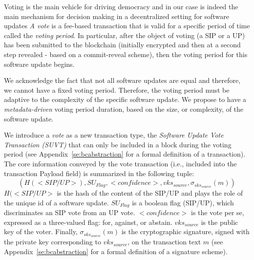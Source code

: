 Voting is the main vehicle for driving democracy and in our case is indeed the
main mechanism for decision making in a decentralized setting for software
updates
\emph{A vote} is a fee-based transaction that is valid for a specific period of
time called the \emph{voting period}. In particular, after the object of voting
(a SIP or a UP) has been submitted to the blockchain (initially encrypted and
then at a second step revealed - based on a commit-reveal
scheme),%
then the voting period for this software update begins.

We acknowledge the fact that not all software updates are equal and therefore,
we cannot have a fixed voting period.
Therefore, the voting period must be adaptive to the complexity of the specific
software update. We propose to have a \emph{metadata-driven} voting period
duration, based on the size, or complexity, of the software
update.%

We introduce a \emph{vote} as a new transaction type, the \emph{Software Update
  Vote Transaction (SUVT)} that can only be included in a block during the
voting period (see Appendix~\ref{se:bcabstraction} for a formal definition of a
transaction). The core information conveyed by the vote transaction (i.e.,
included into the transaction Payload field) is summarized in the following
tuple:
$$( H(<SIP/UP>),SU_{Flag},<confidence>,vks_{source},\sigma_{sks_{source}}(m))$$
$H(<SIP/UP>$ is the hash of the content of the SIP/UP and plays the role of the
unique id of a software update. $SU_{Flag}$ is a boolean flag (SIP/UP), which
discriminates an SIP vote from an UP vote. $<confidence>$ is the vote per se,
expressed as a three-valued flag: for, against, or abstain. $vks_{source}$ is the
public key of the voter. Finally, $\sigma_{sks_{source}}(m)$ is
the cryptographic signature, signed with the private key corresponding to
$vks_{source}$, on the transaction text $m$ (see Appendix~\ref{se:bcabstraction}
for a formal definition of a signature scheme).

